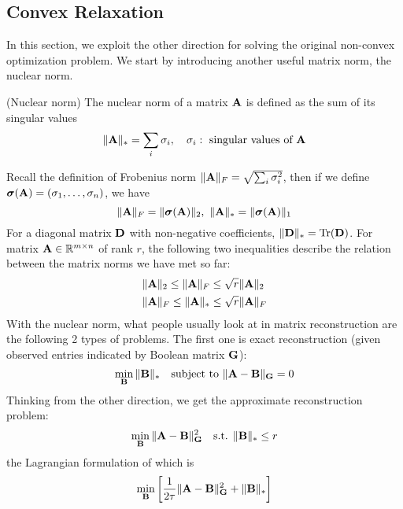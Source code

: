 \documentclass[../book-template.tex]{subfiles}
\begin{document}
\subsection{Convex Relaxation}
In this section, we exploit the other direction for solving the original non-convex optimization problem. We start by introducing another useful matrix norm, the nuclear norm.
\begin{definition}
	(Nuclear norm) The nuclear norm of a matrix ${\bf A}$ is defined as the sum of its singular values
	\begin{equation*}
		\|{\bf A}\|_*=\sum_{i}\sigma_i,\quad \sigma_i:\text{ singular values of }{\bf A}
	\end{equation*}
\end{definition}
Recall the definition of Frobenius norm $\|{\bf A}\|_F=\sqrt{\sum_{i}\sigma_i^2}$, then if we define $\bm{\sigma}({\bf A})=(\sigma_1,\dots,\sigma_n)$, we have
\begin{equation*}
	\|{\bf A}\|_F = \|\bm{\sigma}({\bf A})\|_2,\ \|{\bf A}\|_*=\|\bm{\sigma}({\bf A})\|_1
\end{equation*}
For a diagonal matrix ${\bf D}$ with non-negative coefficients, $\|{\bf D}\|_*=\text{Tr}({\bf D})$. For matrix ${\bf A}\in\mathbb{R}^{m\times n}$ of rank $r$, the following two inequalities describe the relation between the matrix norms we have met so far:
\begin{align*}
	&\|{\bf A}\|_2\leq \|{\bf A}\|_F\leq \sqrt{r}\|{\bf A}\|_2\\
	&\|{\bf A}\|_F\leq \|{\bf A}\|_*\leq \sqrt{r}\|{\bf A}\|_F
\end{align*} 
With the nuclear norm, what people usually look at in matrix reconstruction are the following 2 types of problems. The first one is exact reconstruction (given observed entries indicated by Boolean matrix ${\bf G}$):
\begin{equation*}
	\min_{{\bf B}}\|{\bf B}\|_*\quad \text{subject to }\|{\bf A} - {\bf B}\|_{\bf G}=0
\end{equation*}
Thinking from the other direction, we get the approximate reconstruction problem:
\begin{equation*}
\min_{{\bf B}}\|{\bf A} - {\bf B}\|_{\bf G}^2 \quad \text{s.t. }\|{\bf B}\|_*\leq r
\end{equation*}
the Lagrangian formulation of which is
\begin{equation*}
\min_{{\bf B}}\left[\frac{1}{2\tau}\|{\bf A} - {\bf B}\|_{\bf G}^2 +\|{\bf B}\|_*\right]
\end{equation*}
\end{document}
